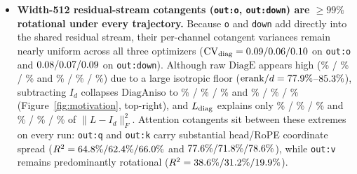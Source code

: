 \begin{itemize}
  \texttt{out:up}). Exact diagonal roots $L_{\diag}$ align with dense
  $L=A^{-1/2}$ at median cosine \motMuonOutGateCosLMed{} / \motOutGateCosLMed{}
  / \motWtOutGateCosLMed{} and \motMuonOutUpCosLMed{} / \motOutUpCosLMed{} /
  \motWtOutUpCosLMed{}, explaining \motMuonOutGateExpVarLMedPct\% /
  \motOutGateExpVarLMedPct\% / \motWtOutGateExpVarLMedPct\% and
  \motMuonOutUpExpVarLMedPct\% / \motOutUpExpVarLMedPct\% /
  \motWtOutUpExpVarLMedPct\% of $\|L-I_d\|_F^2$ ( trajectory
  averages \motOutGateTrajExpVarLMedPct\% and \motOutUpTrajExpVarLMedPct\%),
  whereas omitting preconditioning ($L=I_d$) on  incurs more than
  double the relative error (\motOutGateDropErrLMean{} and
  \motOutUpDropErrLMean{} versus \motOutGateRelErrLMean{} and
  \motOutUpRelErrLMean{}).

\item \textbf{Width-512 residual-stream cotangents (\texttt{out:o},
  \texttt{out:down}) are $\ge 99\%$ rotational under every trajectory.} Because
  \texttt{o} and \texttt{down} add directly into the shared residual stream,
  their per-channel cotangent variances remain nearly uniform across all three
  optimizers ($\mathrm{CV}_{\operatorname{diag}} = 0.09{} /
  0.06{} / 0.10{}$ on \texttt{out:o} and
  $0.08{} / 0.07{} /
  0.09{}$ on \texttt{out:down}). Although raw $\mathrm{DiagE}$
  appears high (\motMuonOutODiagEMedPct\% / \motOutODiagEMedPct\% /
  \motWtOutODiagEMedPct\% and \motMuonOutDownDiagEMedPct\% /
  \motOutDownDiagEMedPct\% / \motWtOutDownDiagEMedPct\%) due to a large
  isotropic floor ($\mathrm{erank}/d = 77.9\%$--$85.3\%$),
  subtracting $I_d$ collapses $\mathrm{DiagAniso}$ to
  \motMuonOutODiagAnisoMedPct\% / \motOutODiagAnisoMedPct\% /
  \motWtOutODiagAnisoMedPct\% and \motMuonOutDownDiagAnisoMedPct\% /
  \motOutDownDiagAnisoMedPct\% / \motWtOutDownDiagAnisoMedPct\%
  (Figure~\ref{fig:motivation}, top-right), and $L_{\diag}$ explains only
  \motMuonOutOExpVarLMedPct\% / \motOutOExpVarLMedPct\% /
  \motWtOutOExpVarLMedPct\% and \motMuonOutDownExpVarLMedPct\% /
  \motOutDownExpVarLMedPct\% / \motWtOutDownExpVarLMedPct\% of $\|L-I_d\|_F^2$.
  Attention cotangents sit between these extremes on every run: \texttt{out:q}
  and \texttt{out:k} carry substantial head/RoPE coordinate spread ($R^2 =
  64.8\% / 62.4\% /
  66.0\%$ and $77.6\% /
  71.8\% / 78.6\%$), while \texttt{out:v}
  remains predominantly rotational ($R^2 = 38.6\% /
  31.2\% / 19.9\%$).


\end{itemize}
